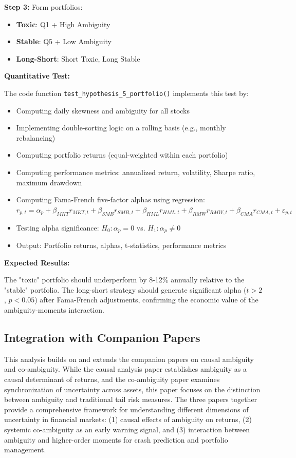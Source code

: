 \documentclass[preprint,12pt,authoryear]{elsarticle}
\begin{document}
\textbf{Step 3:} Form portfolios:
\begin{itemize}
\item \textbf{Toxic}: Q1 + High Ambiguity
\item \textbf{Stable}: Q5 + Low Ambiguity
\item \textbf{Long-Short}: Short Toxic, Long Stable
\end{itemize}

\noindent
\textbf{Quantitative Test:}

The code function \texttt{test\_hypothesis\_5\_portfolio()} implements this test by:
\begin{itemize}
\item Computing daily skewness and ambiguity for all stocks
\item Implementing double-sorting logic on a rolling basis (e.g., monthly rebalancing)
\item Computing portfolio returns (equal-weighted within each portfolio)
\item Computing performance metrics: annualized return, volatility, Sharpe ratio, maximum drawdown
\item Computing Fama-French five-factor alphas using regression: $r_{p,t} = \alpha_p + \beta_{MKT} r_{MKT,t} + \beta_{SMB} r_{SMB,t} + \beta_{HML} r_{HML,t} + \beta_{RMW} r_{RMW,t} + \beta_{CMA} r_{CMA,t} + \varepsilon_{p,t}$
\item Testing alpha significance: $H_0: \alpha_p = 0$ vs. $H_1: \alpha_p \neq 0$
\item Output: Portfolio returns, alphas, t-statistics, performance metrics
\end{itemize}

\noindent
\textbf{Expected Results:}

The "toxic" portfolio should underperform by 8-12\% annually relative to the "stable" portfolio. The long-short strategy should generate significant alpha ($t > 2$, $p < 0.05$) after Fama-French adjustments, confirming the economic value of the ambiguity-moments interaction.

\subsection{Integration with Companion Papers}

This analysis builds on and extends the companion papers on causal ambiguity and co-ambiguity. While the causal analysis paper establishes ambiguity as a causal determinant of returns, and the co-ambiguity paper examines synchronization of uncertainty across assets, this paper focuses on the distinction between ambiguity and traditional tail risk measures. The three papers together provide a comprehensive framework for understanding different dimensions of uncertainty in financial markets: (1) causal effects of ambiguity on returns, (2) systemic co-ambiguity as an early warning signal, and (3) interaction between ambiguity and higher-order moments for crash prediction and portfolio management.
\end{document}
